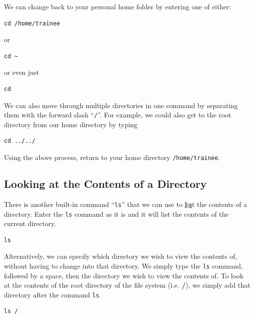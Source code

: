 \documentclass[a4paper,12pt,twoside]{memoir}
\begin{document}
We can change back to your personal home folder by entering one of either:
\begin{steps}
\begin{lstlisting}
cd /home/trainee
\end{lstlisting}
or \\
\begin{lstlisting}
cd ~ 
\end{lstlisting}
or even just \\
\begin{lstlisting}
cd
\end{lstlisting}
\end{steps}

We can also move through multiple directories in one command by separating them with the forward slash ``\texttt{/}''.
For example, we could also get to the root directory from our home directory by typing \\
\begin{lstlisting}
cd ../../ 
\end{lstlisting}

\begin{steps}
Using the above process, return to your home directory \texttt{/home/trainee}. \\
\end{steps}

\subsection{Looking at the Contents of a Directory}
\begin{steps}
There is another built-in command ``\texttt{ls}'' that we can use to \textbf{\underline{l}}i\textbf{\underline{s}}t the contents of a directory.
Enter the \texttt{ls} command as it is and it will list the contents of the current directory. \\
\begin{lstlisting}
ls 
\end{lstlisting}
\end{steps}

\begin{steps}
Alternatively, we can specify which directory we wish to view the contents of, without having to change into that directory.
We simply type the \texttt{ls} command, followed by a space, then the directory we wish to view the contents of.
To look at the contents of the root directory of the file system (i.e. \textbf{/}), we simply add that directory after the command \texttt{ls}. \\
\begin{lstlisting}
ls /
\end{lstlisting}
\end{steps}
\end{document}
